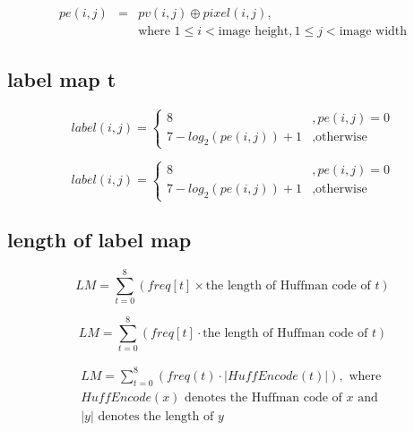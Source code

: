 \begin{align}
	pe(i, j) & = & pv(i, j) \oplus pixel(i, j),  \\
	& & \textrm{where } 1 \leq i < \textrm{image height}, 1 \leq j < \textrm{image width}
\end{align}





\subsection{label map t}

\begin{equation}
	label(i, j) = \left\{ 
	\begin{array}{ll}
		8                       & , pe(i, j) = 0       \\
		7 - log_2(pe(i, j)) + 1 & , \textrm{otherwise}
	\end{array} \right.
\end{equation}

\begin{equation}
	label(i, j) = 
	\begin{cases}
		8                       & , pe(i, j) = 0       \\
		7 - log_2(pe(i, j)) + 1 & , \textrm{otherwise}
	\end{cases} 
\end{equation}






\subsection{length of label map}

\begin{equation}
	LM = \sum_{t=0}^{8} (freq[t] \times \textrm{the length of Huffman code of }t)
\end{equation}

\begin{equation}
	LM = \sum_{t=0}^{8} (freq[t] \cdot \textrm{the length of Huffman code of }t)
\end{equation}

\begin{multline}
	LM = \sum_{t=0}^{8} (freq(t) \cdot \lvert HuffEncode(t) \rvert) , \text{ where } \\
	HuffEncode(x) \text{ denotes the Huffman code of } x \text{ and } \\ 
	\lvert y \rvert \text{ denotes the length of } y
\end{multline}

